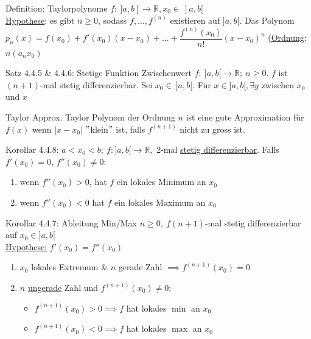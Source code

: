 \documentclass[a4paper,10pt]{article}
\begin{document}
\begin{defbox}
    {Definition: Taylorpolynome}
    $f:\ ]a,b[\longrightarrow \mathbb R, x_0\in \ ]a,b[$
    \\ \underline{Hypothese}: es gibt $n\ge 0$, sodass $f,...,f^{(n)}$ existieren auf $]a,b[$. Das Polynom $p_n(x)=f(x_0)+f'(x_0)(x-x_0)+...+\dfrac{f^{(n)}(x_0)}{n!}(x-x_0)^n$ (\underline{Ordnung}: $n(a_nx_0)$
\end{defbox}
\begin{tbox}
    {Satz 4.4.5 \& 4.4.6: Stetige Funktion Zwischenwert}
    $f:\ ]a,b[\longrightarrow \mathbb R; \ n\ge 0$. $f$ ist $(n+1)$-mal stetig differenzierbar. Sei $x_0\in\ ]a,b[$. Für $x\in]a,b[, \exists y$ zwischen $x_0$ und $x$
\end{tbox}
\begin{tipbox}
    {Taylor Approx.}
    Taylor Polynom der Ordnung $n$ ist eine gute Approximation für $f(x)$ wenn $|x-x_0|$ $"$klein$"$ ist, falls $f^{(n+1)}$ nicht zu gross ist.
\end{tipbox}
\begin{tbox}
    {Korollar 4.4.8: }
    $a<x_0<b;\ f:]a,b[\longrightarrow \mathbb R,$ 2-mal \underline{stetig differenzierbar}. Falls $f'(x_0)=0$, $ f''(x_0) \neq 0$:
    \begin{enumerate}
        \item wenn $f''(x_0)>0$, hat $f$ ein lokales Minimum an $x_0$
        \item wenn $f''(x_0)< 0$ hat $f$ ein lokales Maximum an $x_0$
    \end{enumerate}
\end{tbox}
\begin{tbox}
    {Korollar 4.4.7: Ableitung Min/Max}
    $n\ge 0,\ f(n+1)$-mal stetig differenzierbar auf $x_0\in ]a,b[$
    \\ \underline{Hypothese:} $f'(x_0)=f''(x_0)$
    \begin{enumerate}
        \item $x_0$ lokales Extremum \& $n$ gerade Zahl $\implies f^{(n+1)}(x_0)=0$
        \item $n$ \underline{ungerade} Zahl und $f^{(n+1)}(x_0)\neq 0$:
        \begin{itemize}
            \item $f^{(n+1)}(x_0)>0 \implies f$ hat lokales \underline{$\min$} an $x_0$
            \item $f^{(n+1)}(x_0)<0 \implies f$ hat lokales \underline{$\max$} an $x_0$ 
        \end{itemize}
    \end{enumerate}
\end{tbox}
\end{document}
